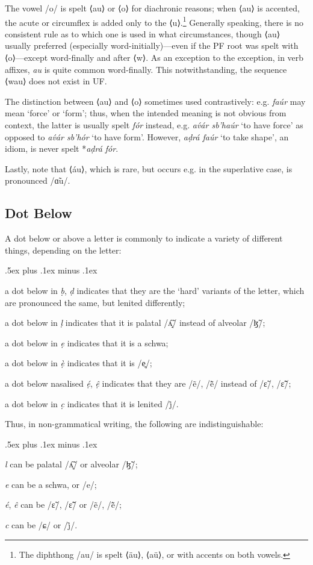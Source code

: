 \documentclass[a4paper, 12pt, twoside, openright, final]{book}
\let \w \textit
\begin{document}
The vowel /o/ is spelt ⟨au⟩ or ⟨o⟩ for diachronic reasons; when ⟨au⟩ is accented, the acute or circumflex is added only to the
⟨u⟩.\footnote{The diphthong /au/ is spelt ⟨äu⟩, ⟨aü⟩, or with accents on both vowels.} Generally speaking, there is no consistent
rule as to which one is used in what circumstances, though ⟨au⟩ usually preferred (especially word-initially)—even if the
PF root was spelt with ⟨o⟩—except word-finally and after ⟨w⟩. As an exception to the exception, in verb affixes, \w{au} is quite
common word-finally. This notwithstanding, the sequence ⟨wau⟩ does not exist in UF.

The distinction between ⟨au⟩ and ⟨o⟩ sometimes used contrastively: e.g. \w{faúr} may mean ‘force’ or ‘form’; thus, when the
intended meaning is not obvious from context, the latter is usually spelt \w{fór} instead, e.g. \w{av́ár sb’haúr} ‘to have force’
as opposed to \w{av́ár sb’hór} ‘to have form’. However, \w{aḍrá faúr} ‘to take shape’, an idiom, is never spelt *\w{aḍrá fór}.

Lastly, note that ⟨áu⟩, which is rare, but occurs e.g. in the superlative case, is pronounced /ɑ̃u/.

\subsection{Dot Below}
A dot below or above a letter is commonly to indicate
a variety of different things, depending on the letter:
\begin{items}\itemsep .5ex plus .1ex minus .1ex\relax
\item a dot below in \w{ḅ}, \w{ḍ} indicates that they are the ‘hard’ variants of the letter, which are pronounced
      the same, but lenited differently;
\item a dot below in \w{ḷ} indicates that it is palatal /ʎ̝̃/ instead of alveolar /ɮ̃/;
\item a dot below in \w{ẹ} indicates that it is a schwa;
\item a dot below in \w{ẹ̀} indicates that it is /e̥/;
\item a dot below nasalised \w{ẹ́}, \w{ệ} indicates that they are /ẽ/, /ẽ̃/ instead of /ɛ̃/, /ɛ̃̃/;
\item a dot below in \w{c̣} indicates that it is lenited /j̊/.
\end{items}

\noindent Thus, in non-grammatical writing, the following are indistinguishable:
\begin{items}\itemsep .5ex plus .1ex minus .1ex\relax
\item \w{l} can be palatal /ʎ̝̃/ or alveolar /ɮ̃/;
\item \w{e} can be a schwa, or /e/;
\item \w{é}, \w{ê} can be /ɛ̃/, /ɛ̃̃/ or /ẽ/, /ẽ̃/;
\item \w{c} can be /ɕ/ or /j̊/.
\end{items}
\end{document}
